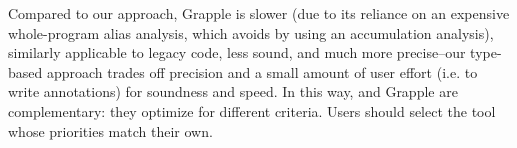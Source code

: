 Compared to our approach, Grapple is slower (due to its reliance on
an expensive whole-program alias analysis, which \tool avoids by using
an accumulation analysis), similarly applicable to legacy
code, less sound, and much more precise--our type-based approach
trades off precision and a small amount of user effort (i.e. to write annotations)
for soundness and speed. In this way, \tool and Grapple are complementary:
they optimize for different criteria. Users should select the tool whose
priorities match their own.

